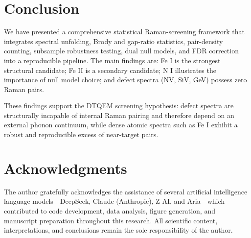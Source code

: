 \documentclass[11pt,a4paper]{article}
\begin{document}
\section{Conclusion}
\label{sec:conclusion}

We have presented a comprehensive statistical Raman-screening framework that integrates spectral unfolding, Brody and gap-ratio statistics, pair-density counting, subsample robustness testing, dual null models, and FDR correction into a reproducible pipeline. The main findings are: Fe I is the strongest structural candidate; Fe II is a secondary candidate; N I illustrates the importance of null model choice; and defect spectra (NV, SiV, GeV) possess zero Raman pairs.

These findings support the DTQEM screening hypothesis: defect spectra are structurally incapable of internal Raman pairing and therefore depend on an external phonon continuum, while dense atomic spectra such as Fe I exhibit a robust and reproducible excess of near-target pairs.

\section*{Acknowledgments}

The author gratefully acknowledges the assistance of several artificial intelligence language models---DeepSeek, Claude (Anthropic), Z-AI, and Aria---which contributed to code development, data analysis, figure generation, and manuscript preparation throughout this research. All scientific content, interpretations, and conclusions remain the sole responsibility of the author.
\end{document}
